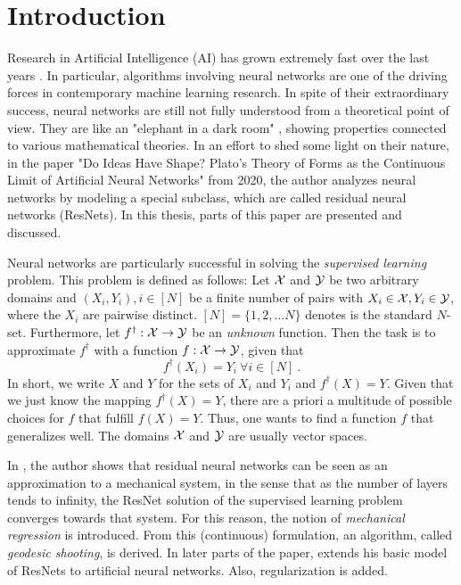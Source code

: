 \section{Introduction}

Research in Artificial Intelligence (AI) has grown extremely fast over the last years \cite{aireport21}.
In particular, algorithms involving neural networks are one of the driving forces in contemporary machine learning research.
In spite of their extraordinary success, neural networks are still not fully understood from a theoretical point of view.
They are like an "elephant in a dark room" \cite{owhadi20,rumi95}, showing properties connected to various mathematical theories.
In an effort to shed some light on their nature, in the paper "Do Ideas Have Shape? Plato's Theory of Forms as the Continuous Limit of Artificial Neural Networks" \cite{owhadi20} from 2020, the author analyzes neural networks by modeling a special subclass, which are called residual neural networks (ResNets).
In this thesis, parts of this paper are presented and discussed.

Neural networks are particularly successful in solving the \emph{supervised learning} problem.
This problem is defined as follows:
Let $\mathcal{X}$ and $\mathcal{Y}$ be two arbitrary domains and $(X_i, Y_i), i \in [N]$ be a finite number of pairs with $X_i \in \mathcal{X}, Y_i \in \mathcal{Y}$, where the $X_i$ are pairwise distinct.
$[N] = \{1, 2, \ldots N\}$ denotes is the standard $N$-set.
Furthermore, let $f^\dagger: \mathcal{X} \rightarrow \mathcal{Y}$ be an \emph{unknown} function.
Then the task is to approximate $f^\dagger$ with a function $f: \mathcal{X} \rightarrow \mathcal{Y}$, given that
\begin{equation}
	f^\dagger(X_i) = Y_i \ \forall i \in [N] \ .
\end{equation}
In short, we write $X$ and $Y$ for the sets of $X_i$ and $Y_i$ and $f^\dagger(X) = Y$.
Given that we just know the mapping $f^\dagger(X) = Y$, there are a priori a multitude of possible choices for $f$ that fulfill $f(X) = Y$.
Thus, one wants to find a function $f$ that generalizes well.
The domains $\mathcal{X}$ and $\mathcal{Y}$ are usually vector spaces.

In \cite{owhadi20}, the author shows that residual neural networks can be seen as an approximation to a mechanical system, in the sense that as the number of layers tends to infinity, the ResNet solution of the supervised learning problem converges towards that system.
For this reason, the notion of \emph{mechanical regression} is introduced.
From this (continuous) formulation, an algorithm, called \emph{geodesic shooting}, is derived.
In later parts of the paper, \citet{owhadi20} extends his basic model of ResNets to artificial neural networks.
Also, regularization is added.

